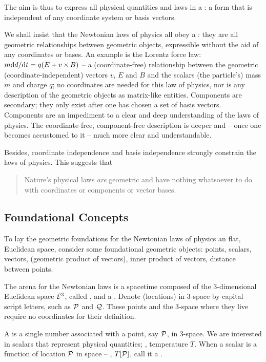 The aim is thus to express all physical quantities and laws in a : a form that is independent of any coordinate system or basis vectors.

We shall insist that the Newtonian laws of physics all obey a : they are all geometric relationships between geometric objects, expressible without the aid of any coordinates or bases. An example is the Lorentz force law: $m\text{d} d/\text{d} t = q(E + v\operatorname{\times} B)$ -- a (coordinate-free) relationship between the geometric (coordinate-independent) vectors $v$, $E$ and $B$ and the scalars (the particle's) mass $m$ and charge $q$; no coordinates are needed for this law of physics, nor is any description of the geometric objects as matrix-like entities. Components are secondary; they only exist after one has chosen a set of basis vectors. Components are an impediment to a clear and deep understanding of the laws of physics. The coordinate-free, component-free description is deeper and -- once one becomes accustomed to it -- much more clear and understandable.

Besides, coordinate independence and basis independence strongly constrain the laws of physics. This suggests that
\begin{quote}
Nature's physical laws \emph{are} geometric and have nothing whatsoever to do with coordinates or components or vector bases.
\end{quote}


\subsection{Foundational Concepts}
To lay the geometric foundations for the Newtonian laws of physics an flat, Euclidean space, consider some foundational geometric objects: points, scalars, vectors, (geometric product of vectors), inner product of vectors, distance between points.

The arena for the Newtonian laws is a spacetime composed of the 3-dimensional Euclidean space $\mathcal{E}^{3}$, called , and a . Denote  (locations) in 3-space by capital script letters, such as $\mathcal{P}$ and $\mathcal{Q}$. These points and the 3-space where they live require no coordinates for their definition.

A  is a single number associated with a point, say $\mathcal{P}$, in 3-space. We are interested in scalars that represent physical quantities; \eg, temperature $T$. When a scalar is a function of location $\mathcal{P}$ in space -- \eg, $T\!\left[{\mathcal{P}}\right]$, call it a .

